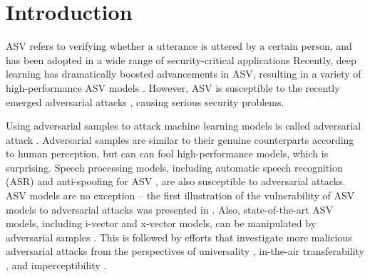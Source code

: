 \section{Introduction}
\label{sec:intro}
ASV refers to verifying whether a utterance is uttered by a certain person, and has been adopted in a wide range of security-critical applications
Recently, deep learning has dramatically boosted advancements in ASV, resulting in a variety of high-performance ASV models \cite{dehak2010front,kenny2012small,snyder2018x}.
However, ASV is susceptible to the recently emerged adversarial attacks \cite{kreuk2018fooling,das2020attacker}, causing serious security problems.

Using adversarial samples to attack machine learning models is called adversarial attack \cite{szegedy2013intriguing}.
Adversarial samples are similar to their genuine counterparts according to human perception, but can can fool high-performance models, which is surprising.
Speech processing models, including automatic speech recognition (ASR) \cite{carlini2018audio,qin2019imperceptible} and anti-spoofing for ASV \cite{liu2019adversarial,wu2020defense_2,wu2020defense}, are also susceptible to adversarial attacks.
ASV models are no exception \cite{das2020attacker,jati2021adversarial} – the first illustration of the vulnerability of ASV models to adversarial attacks was presented in \cite{kreuk2018fooling}. 
Also, state-of-the-art ASV models, including i-vector and x-vector models, can be manipulated by adversarial samples \cite{villalba2020x,li2020adversarial}.
This is followed by efforts that investigate more malicious adversarial attacks from the perspectives of universality \cite{marras2019adversarial}, in-the-air transferability \cite{li2020practical}, and imperceptibility \cite{wang2020inaudible}.


